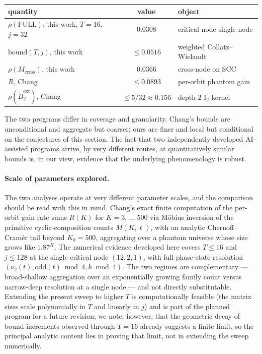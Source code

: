 \documentclass[11pt,a4paper]{article}
\theoremstyle{definition}
\newcommand{\full}{\mathrm{FULL}}
\newcommand{\spec}{\rho}
\begin{document}
\begin{center}
\begin{tabular}{lcl}
\toprule
quantity & value & object \\
\midrule
$\spec(\full)$, this work, $T=16$, $j=32$ & $0.0308$ & critical-node single-node \\
$\mathrm{bound}(T,j)$, this work & $\le 0.0516$ & weighted Collatz--Wielandt \\
$\spec(M_{\mathrm{cross}})$, this work & $0.0366$ & cross-node on SCC \\
$R$, Chang \cite[Thm.~7.19]{chang2026} & $\le 0.0893$ & per-orbit phantom gain \\
$\spec(\widetilde{B}_2^{\mathrm{ext}})$, Chang \cite[Thm.~C.3]{chang2026} & $\le 5/32 \approx 0.156$ & depth-$2$ I$_2$ kernel \\
\bottomrule
\end{tabular}
\end{center}

The two programs differ in coverage and granularity. Chang's
bounds are unconditional and aggregate but coarser; ours are
finer and local but conditional on the conjectures of this
section. The fact that two independently developed AI-assisted
programs arrive, by very different routes, at quantitatively
similar bounds is, in our view, evidence that the underlying
phenomenology is robust.

\paragraph{Scale of parameters explored.}
The two analyses operate at very different parameter scales, and
the comparison should be read with this in mind. Chang's exact
finite computation of the per-orbit gain rate
\cite[Theorem~7.19, Step 2]{chang2026} sums $R(K)$ for
$K = 3, \ldots, 500$ via M\"obius inversion of the primitive
cyclic-composition counts $M(K, \ell)$, with an analytic
Chernoff--Cram\'er tail beyond $K_0 = 500$, aggregating over a
phantom universe whose size grows like $1.87^K$. The numerical
evidence developed here covers $T \le 16$ and $j \le 128$ at the
single critical node $(12, 2, 1)$, with full phase-state resolution
$(\nu_2(t), \mathrm{odd}(t) \bmod 4, h \bmod 4)$. The two regimes
are complementary --- broad-shallow aggregation over an
exponentially growing family count versus narrow-deep resolution
at a single node --- and not directly substitutable. Extending
the present sweep to higher $T$ is computationally feasible (the
matrix sizes scale polynomially in $T$ and linearly in $j$) and
is part of the planned program for a future revision; we note,
however, that the geometric decay of bound increments observed
through $T = 16$ already suggests a finite limit, so the principal
analytic content lies in proving that limit, not in extending the
sweep numerically.
\end{document}

